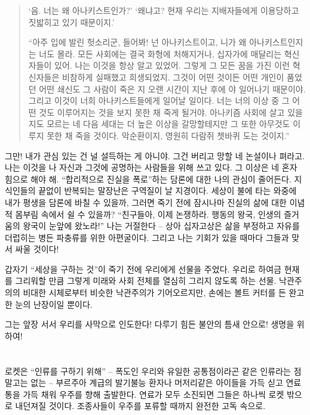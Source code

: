 \documentclass[10pt, b6paper, openany]{memoir}
\begin{document}
\begin{article}
\begin{quote}
`음. 너는 왜 아나키스트인가?' `왜냐고? 현재 우리는 지배자들에게 이용당하고 짓밟히고 있기 때문이지.' 

``아주 입에 발린 헛소리군, 들어봐! 넌 아나키스트이고, 니가 왜 아나키스트인지는 너도 몰라. 모든 사회에는 결국 화형에 처해지거나, 십자가에 매달리는 혁신자들이 있어. 나는 이것을 항상 알고 있었어. 그렇게 그 모든 꿈을 가진 이런 혁신자들은 비참하게 실패했고 희생되었지. 그것이 어떤 것이든 어떤 개인이 품었던 어떤 쇄신도 그 사람이 죽은 지 오랜 시간이 지난 후에 야 일어나기 때문이야. 그리고 이것이 너희 아나키스트들에게 일어날 일이다. 너는 너의 이상 중 그 어떤 것도 이루어지는 것을 보지 못한 채 죽게 될거야. 아나키즘 사회에 살고 있을지도 모르는 네 다음 세대는 더 높은 이상을 갈망할테지만 그 또한 아무것도 이루지 못한 채 죽을 것이다. 악순환이지, 영원히 다람쥐 쳇바퀴 도는 것이지.''\parencite{ibk:bruno2008}
\end{quote}

그만! 내가 관심 있는 건 널 설득하는 게 아니야. 그건 버리고 망할 네 논설이나 펴라고. 나는 이것을 나 자신과 그것에 공명하는 사람들을 위해 쓰고 있다. 그 이상은 네 혼자 힘으로 해야 해. ``합리적으로 진실을 폭로''하는 담론에 대한 나의 관심이 줄어든다. 지식인들의 끝없이 반복되는 말장난은 구역질이 날 지경이다. 세상이 불에 타는 와중에 내가 평생을 담론에 바칠 수 있을까, 그러면 죽기 전에 잠시나마 진실의 삶에 대한 이념적 몸부림 속에서 쉴 수 있을까? ``친구들아, 이제 논쟁하라. 행동의 왕국, 인생의 즐거움의 왕국이 눈앞에 왔노라!'' 나는 거절한다 -- 상아 십자고상은 삶을 부정하고 자유를 더럽히는 병든 파충류를 위한 아편굴이다. 그리고 나는 기회가 있을 때마다 그들과 맞서 싸울 것이다!

갑자기 ``세상을 구하는 것''이 죽기 전에 우리에게 선물을 주었다. 우리로 하여금 현재를 그리워할 만큼 그렇게 미래와 사회 전체를 열심히 그리지 않도록 하는 선물. 낙관주의의 비대한 시체로부터 비슷한 낙관주의가 기어오르지만, 손에는 볼트 커터를 든 완고한 눈의 난장이일 뿐이다.

그는 앞장 서서 우리를 사막으로 인도한다! 다루기 힘든 불안의 틈새 안으로! 생명을 위하여! 

\section{}

로켓은 ``인류를 구하기 위해'' --  폭도인 우리와 유일한 공통점이라곤 같은 인류라는 점 말고는 없는 -- 부르주아 계급의 발기불능 환자나 머저리같은 아이들을 가득 싣고 연료통을 가득 채워 우주를 향해 출발한다. 연료가 모두 소진되면 그들은 하나씩 로켓 밖으로 내던져질 것이다. 조종사들이 우주를 포류할 때까지 완전한 고독 속으로. 


\end{article}
\end{document}
